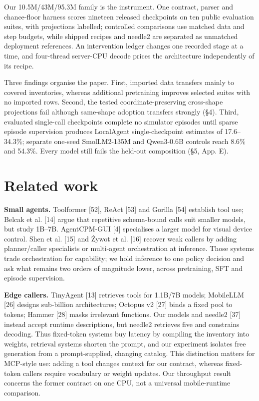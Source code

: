 \documentclass{article}
\begin{document}
Our 10.5M/43M/95.3M family is the instrument. One contract, parser and chance-floor harness
scores nineteen released checkpoints on ten public evaluation suites, with projections labelled;
controlled comparisons use matched data and step budgets, while shipped recipes and needle2 are
separated as unmatched deployment references. An intervention ledger changes one recorded stage
at a time, and four-thread server-CPU decode prices the architecture independently of its recipe.


Three findings organise the paper. First, imported data transfers mainly to covered inventories,
whereas additional pretraining improves selected suites with no imported rows. Second, the tested
coordinate-preserving cross-shape projections fail although same-shape adoption transfers strongly
(\S4). Third, evaluated single-call checkpoints complete no simulator episodes until sparse episode
supervision produces LocalAgent single-checkpoint estimates of 17.6--34.3\%; separate one-seed
SmolLM2-135M and Qwen3-0.6B controls reach 8.6\% and 54.3\%. Every model
still fails the held-out composition (\S5, App. E).

\section{Related work}

\textbf{Small agents.} Toolformer [52], ReAct [53] and Gorilla [54] establish tool use; Belcak et
al. [14] argue that repetitive schema-bound calls suit smaller models, but study 1B--7B.
AgentCPM-GUI [4] specialises a larger model for visual device control. Shen et al. [15] and
\.{Z}ywot et al. [16] recover weak callers by adding planner/caller specialists
or multi-agent orchestration at inference. Those systems trade orchestration for capability; we
hold inference to one policy decision and ask what remains two orders of magnitude lower, across
pretraining, SFT and episode supervision.


\textbf{Edge callers.} TinyAgent [13] retrieves tools for 1.1B/7B models; MobileLLM [26] designs
sub-billion architectures; Octopus v2 [27] binds a fixed pool to tokens; Hammer [28] masks
irrelevant functions. Our models and needle2 [37] instead accept runtime descriptions, but
needle2 retrieves five and constrains decoding. Thus fixed-token systems buy latency by compiling
the inventory into weights, retrieval systems shorten the prompt, and our experiment isolates free
generation from a prompt-supplied, changing catalog. This distinction matters for MCP-style use:
adding a tool changes context for our contract, whereas fixed-token callers require vocabulary or
weight updates. Our throughput result concerns the former contract on one CPU, not a universal
mobile-runtime comparison.
\end{document}
